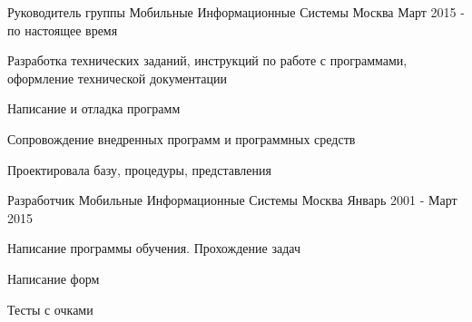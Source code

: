 

\begin{cventries}

  \cventry
    {Руководитель группы} %
    {Мобильные Информационные Системы} %
    {Москва} %
    {Март 2015 - по настоящее время} %
    {
      \begin{cvitems} %
        \item {Разработка технических заданий, инструкций по работе с программами, оформление технической документации}
        \item {Написание и отладка программ}
        \item {Сопровождение внедренных программ и программных средств}
        \item {Проектировала базу, процедуры, представления}
      \end{cvitems}
    }
  \cventry
    {Разработчик} %
    {Мобильные Информационные Системы} %
    {Москва} %
    {Январь 2001 - Март 2015} %
    {
      \begin{cvitems} %
        \item {Написание программы обучения. Прохождение задач}
        \item {Написание форм}
        \item {Тесты с очками}
      \end{cvitems}
    }    

\end{cventries}
